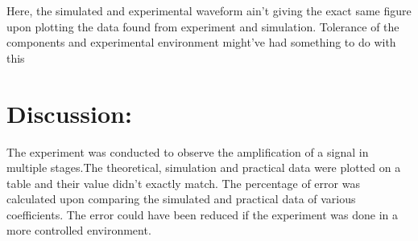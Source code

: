 \documentclass[a4paper, 12pt]{extarticle}
\begin{document}
Here, the simulated and experimental waveform ain't giving the exact same figure upon plotting the data found from experiment and simulation. Tolerance of the components and experimental environment might've had something to do with this
\newpage

\section{Discussion:}
\begin{enumerate}
 The experiment was conducted to observe the amplification of a signal in multiple stages.The theoretical, simulation and practical data were plotted on a table and their value didn't exactly match. The percentage of error was calculated upon comparing the simulated and practical data of various coefficients. The error could have been reduced if the experiment was done in a more controlled environment.
\end{enumerate}
\end{document}
